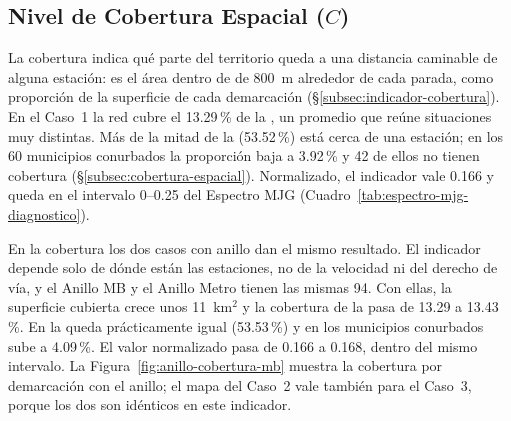 %
\subsection{Nivel de Cobertura Espacial (\texorpdfstring{$C$}{C})}
\label{subsec:anillo-cobertura}

La cobertura indica qué parte del territorio queda a una distancia caminable
de alguna estación: es el área dentro de  de 800~m alrededor
de cada parada, como proporción de la superficie de cada demarcación
(§\ref{subsec:indicador-cobertura}). En el Caso~1 la red cubre el 13.29\,\% de
la \zmvm{}, un promedio que reúne situaciones muy distintas. Más de la mitad
de la \cdmx{} (53.52\,\%) está cerca de una estación; en los 60 municipios
conurbados la proporción baja a 3.92\,\% y 42 de ellos no tienen cobertura
(§\ref{subsec:cobertura-espacial}). Normalizado, el indicador vale 0.166 y
queda en el intervalo 0--0.25 del Espectro MJG
(Cuadro~\ref{tab:espectro-mjg-diagnostico}).

En la cobertura los dos casos con anillo dan el mismo resultado. El indicador
depende solo de dónde están las estaciones, no de la velocidad ni del derecho
de vía, y el Anillo MB y el Anillo Metro tienen las mismas 94. Con ellas, la
superficie cubierta crece unos 11~km$^2$ y la cobertura de la \zmvm{} pasa de
13.29 a 13.43\,\%. En la \cdmx{} queda prácticamente igual (53.53\,\%) y en
los municipios conurbados sube a 4.09\,\%. El valor normalizado pasa de 0.166
a 0.168, dentro del mismo intervalo. La
Figura~\ref{fig:anillo-cobertura-mb} muestra la cobertura por demarcación con
el anillo; el mapa del Caso~2 vale también para el Caso~3, porque los dos son
idénticos en este indicador.

